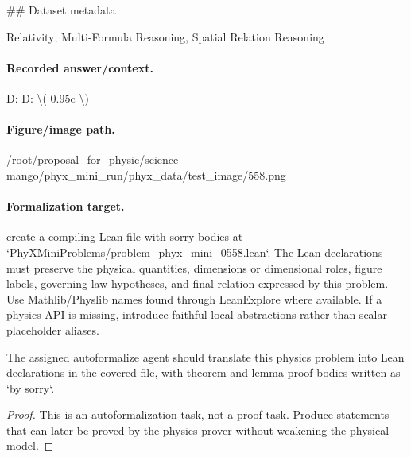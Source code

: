 \#\# Dataset metadata

Relativity; Multi-Formula Reasoning, Spatial Relation Reasoning

\paragraph{Recorded answer/context.}
D: D: \textbackslash{}( 0.95c \textbackslash{})

\paragraph{Figure/image path.}
/root/proposal\_for\_physic/science-mango/phyx\_mini\_run/phyx\_data/test\_image/558.png

\paragraph{Formalization target.}
create a compiling Lean file with sorry bodies at `PhyXMiniProblems/problem\_phyx\_mini\_0558.lean`. The Lean declarations must preserve the physical quantities, dimensions or dimensional roles, figure labels, governing-law hypotheses, and final relation expressed by this problem.
Use Mathlib/Physlib names found through LeanExplore where available. If a physics API is missing, introduce faithful local abstractions rather than scalar placeholder aliases.

\begin{theorem}
\label{thm:physics:phyx_mini_0558:target}
The assigned autoformalize agent should translate this physics problem into Lean declarations in the covered file, with theorem and lemma proof bodies written as `by sorry`.
\end{theorem}
\begin{proof}
This is an autoformalization task, not a proof task. Produce statements that can later be proved by the physics prover without weakening the physical model.
\end{proof}

